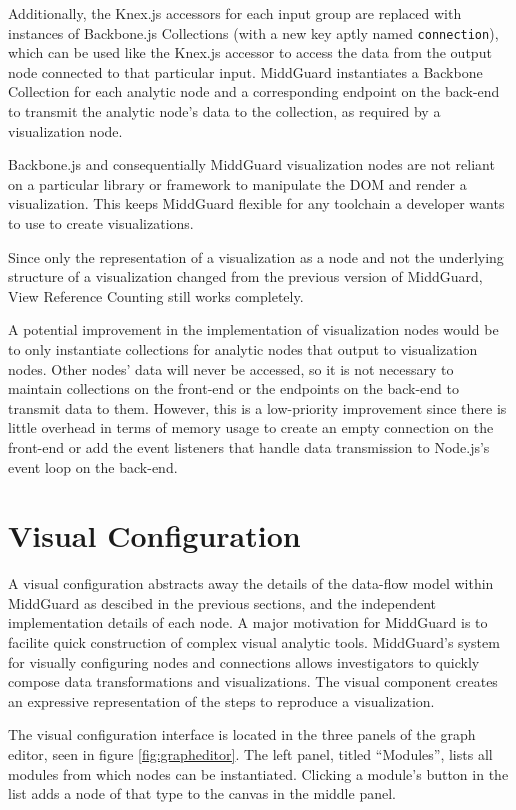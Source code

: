 \documentclass[midd]{thesis}
\begin{document}
Additionally, the Knex.js accessors for each input group are replaced with
instances of Backbone.js Collections (with a new key aptly named
\texttt{connection}), which can be used like the Knex.js accessor to access the
data from the output node connected to that particular input. MiddGuard
instantiates a Backbone Collection for each analytic node and a corresponding
endpoint on the back-end to transmit the analytic node's data to the collection,
as required by a visualization node.

Backbone.js and consequentially MiddGuard visualization nodes are not
reliant on a particular library or framework to manipulate the DOM and render a
visualization. This keeps MiddGuard flexible for any toolchain a developer wants
to use to create visualizations.

Since only the representation of a visualization as a node and not the
underlying structure of a visualization changed from the previous version of
MiddGuard, View Reference Counting still works completely.

A potential improvement in the implementation of visualization nodes would be to
only instantiate collections for analytic nodes that output to visualization
nodes. Other nodes' data will never be accessed, so it is not necessary to
maintain collections on the front-end or the endpoints on the back-end to
transmit data to them. However, this is a low-priority improvement since there
is little overhead in terms of memory usage to create an empty connection on the
front-end or add the event listeners that handle data transmission to Node.js's
event loop on the back-end.

\section{Visual Configuration}

A visual configuration abstracts away the details of the data-flow model within
MiddGuard as descibed in the previous sections, and the independent
implementation details of each node. A major motivation for MiddGuard is to
facilite quick construction of complex visual analytic tools. MiddGuard's system
for visually configuring nodes and connections allows investigators to quickly
compose data transformations and visualizations. The visual component creates an
expressive representation of the steps to reproduce a visualization.

The visual configuration interface is located in the three panels of the graph
editor, seen in figure \ref{fig:grapheditor}. The left panel, titled
``Modules'', lists all modules from which nodes can be instantiated. Clicking a
module's button in the list adds a node of that type to the canvas in the middle
panel.
\end{document}
